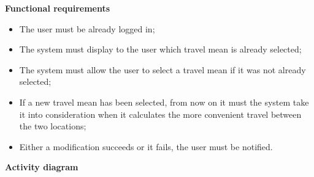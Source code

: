 \documentclass{article}
\begin{document}
	\bigskip
	\noindent
	\textbf{Functional requirements} \\
	\begin{itemize}
		\item The user must be already logged in;
		\item The system must display to the user which travel mean is already selected;
		\item The system must allow the user to select a travel mean if it was not already selected;
		\item If a new travel mean has been selected, from now on it must the system take it into consideration when it calculates the more convenient travel between the two locations;
		\item Either a modification succeeds or it fails, the user must be notified.
	\end{itemize}
	
	\newpage
	\noindent
	\textbf{Activity diagram} \\
	
\end{document}
